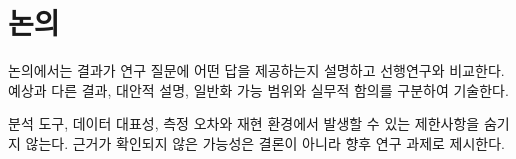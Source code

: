 \section{논의}

논의에서는 결과가 연구 질문에 어떤 답을 제공하는지 설명하고 선행연구와 비교한다. 예상과 다른 결과, 대안적 설명, 일반화 가능 범위와 실무적 함의를 구분하여 기술한다.

분석 도구, 데이터 대표성, 측정 오차와 재현 환경에서 발생할 수 있는 제한사항을 숨기지 않는다. 근거가 확인되지 않은 가능성은 결론이 아니라 향후 연구 과제로 제시한다.
